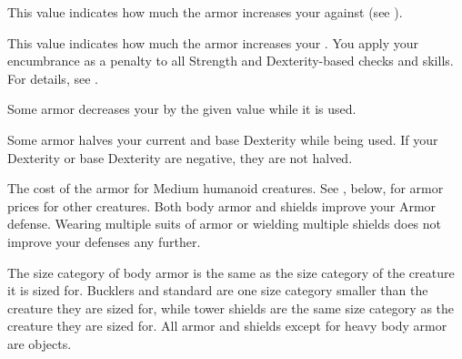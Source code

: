          This value indicates how much the armor increases your  against  (see ).

         This value indicates how much the armor increases your .
        You apply your encumbrance as a penalty to all Strength and Dexterity-based checks and skills.
        For details, see .

         Some armor decreases your  by the given value while it is used.

         Some armor halves your current and base Dexterity while being used.
        If your Dexterity or base Dexterity are negative, they are not halved.

         The cost of the armor for Medium humanoid creatures.
        See , below, for armor prices for other creatures.
         Both body armor and shields improve your Armor defense.
        Wearing multiple suits of armor or wielding multiple shields does not improve your defenses any further.

         The size category of body armor is the same as the size category of the creature it is sized for.
        Bucklers and standard are one size category smaller than the creature they are sized for, while tower shields are the same size category as the creature they are sized for.
        All armor and shields except for heavy body armor are  objects.

